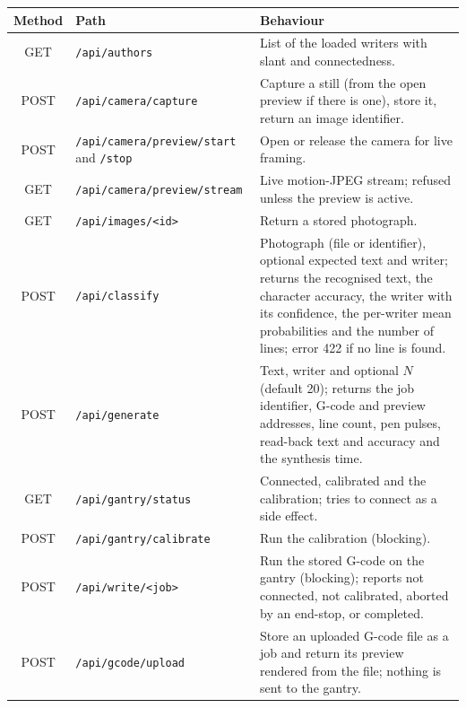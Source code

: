 \begin{table}[h]
\centering
\fontsize{9}{11}\selectfont
\begin{tabularx}{\linewidth}{|c|p{4.0cm}|X|}
\hline
\textbf{Method} & \textbf{Path} & \textbf{Behaviour} \\
\hline
GET & \texttt{/\allowbreak api/\allowbreak authors} & List of the loaded writers with slant and connectedness. \\
\hline
POST & \texttt{/\allowbreak api/\allowbreak camera/\allowbreak capture} & Capture a still (from the open preview if there is one), store it, return an image identifier. \\
\hline
POST & \texttt{/\allowbreak api/\allowbreak camera/\allowbreak preview/\allowbreak start} and \texttt{/stop} & Open or release the camera for live framing. \\
\hline
GET & \texttt{/\allowbreak api/\allowbreak camera/\allowbreak preview/\allowbreak stream} & Live motion-JPEG stream; refused unless the preview is active. \\
\hline
GET & \texttt{/\allowbreak api/\allowbreak images/\allowbreak <id>} & Return a stored photograph. \\
\hline
POST & \texttt{/\allowbreak api/\allowbreak classify} & Photograph (file or identifier), optional expected text and writer; returns the recognised text, the character accuracy, the writer with its confidence, the per-writer mean probabilities and the number of lines; error 422 if no line is found. \\
\hline
POST & \texttt{/\allowbreak api/\allowbreak generate} & Text, writer and optional $N$ (default 20); returns the job identifier, G-code and preview addresses, line count, pen pulses, read-back text and accuracy and the synthesis time. \\
\hline
GET & \texttt{/\allowbreak api/\allowbreak gantry/\allowbreak status} & Connected, calibrated and the calibration; tries to connect as a side effect. \\
\hline
POST & \texttt{/\allowbreak api/\allowbreak gantry/\allowbreak calibrate} & Run the calibration (blocking). \\
\hline
POST & \texttt{/\allowbreak api/\allowbreak write/\allowbreak <job>} & Run the stored G-code on the gantry (blocking); reports not connected, not calibrated, aborted by an end-stop, or completed. \\
\hline
POST & \texttt{/\allowbreak api/\allowbreak gcode/\allowbreak upload} & Store an uploaded G-code file as a job and return its preview rendered from the file; nothing is sent to the gantry. \\

\end{tabularx}
\end{table}
